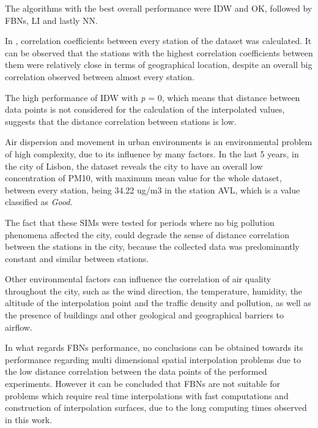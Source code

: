 The algorithms with the best overall performance were IDW and OK, followed by FBNs, LI and lastly NN.

In , correlation coefficients between every station of the dataset was calculated. It can be observed that the stations with the highest correlation coefficients between them were relatively close in terms of geographical location, despite an overall big correlation observed between almost every station.

The high performance of IDW with \textit{p} = 0, which means that distance between data points is not considered for the calculation of the interpolated values, suggests that the distance correlation between stations is low.


Air dispersion and movement in urban environments is an environmental problem of high complexity, due to its influence by many factors. In the last 5 years, in the city of Lisbon, the dataset reveals the city to have an overall low concentration of PM10, with maximum mean value for the whole dataset, between every station, being 34.22 ug/m3 in the station AVL, which is a value classified as \textit{Good}.

The fact that these SIMs were tested for periods where no big pollution phenomena affected the city, could degrade the sense of distance correlation between the stations in the city, because the collected data was predominantly constant and similar between stations.

Other environmental factors can influence the correlation of air quality throughout the city, such as the wind direction, the temperature, humidity, the altitude of the interpolation point and the traffic density and pollution, as well as the presence of buildings and other geological and geographical barriers to airflow.

In what regards FBNs performance, no conclusions can be obtained towards its performance regarding multi dimensional spatial interpolation problems due to the low distance correlation between the data points of the performed experiments. However it can be concluded that FBNs are not suitable for problems which require real time interpolations with fast computations and construction of interpolation surfaces, due to the long computing times observed in this work.



